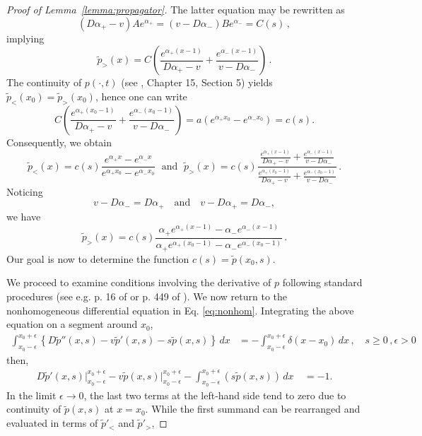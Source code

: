 \documentclass[preprint,12pt]{elsarticle}
\numberwithin{equation}{section}
\theoremstyle{plain} \newtheorem{theorem}{Theorem}[section]
\theoremstyle{plain} \newtheorem{proposition}[theorem]{Proposition}
\theoremstyle{plain} \newtheorem{lemma}[theorem]{Lemma}
\theoremstyle{plain} \newtheorem{corollary}[theorem]{Corollary}
\theoremstyle{definition} \newtheorem{definition}[theorem]{Definition}
\theoremstyle{definition} \newtheorem{notation}[theorem]{Notation}
\theoremstyle{remark} \newtheorem{remark}[theorem]{Remark}
\theoremstyle{remark} \newtheorem{remarks}[theorem]{Remarks}
\theoremstyle{remark} \newtheorem{algorithm2}[theorem]{Algorithm}
\theoremstyle{remark} \newtheorem{example}[theorem]{Example}
\begin{document}
\begin{appendices}
\begin{proof}[Proof of Lemma~\ref{lemma:propagator}]
The latter equation may be rewritten as
\begin{equation*}
	(D\alpha_+ - v)Ae^{\alpha_+} = (v - D\alpha_-)Be^{\alpha_-} = C(s)\,,
\end{equation*}
implying
\begin{equation*}
	\tilde{p}_>(x)=C\left(
	\frac{e^{\alpha_+ (x-1)}}{D\alpha_+ - v}+
	\frac{e^{\alpha_- (x-1)}}{v - D\alpha_-}
	\right)\,.
\end{equation*}
The continuity of $p(\cdot,t)$ (see \cite{karlin_taylor_1981}, Chapter 15, Section 5)
yields $\tilde{p}_<(x_0)=\tilde{p}_>(x_0)$, hence one can write
\begin{equation*}
	C\left(
	\frac{e^{\alpha_+ (x_0-1)}}{D\alpha_+ - v}+
	\frac{e^{\alpha_- (x_0-1)}}{v - D\alpha_-}
	\right)
	=
	a\left(
	e^{\alpha_+ x_0}-e^{\alpha_- x_0}
	\right)
	=c(s).
\end{equation*}
Consequently, we obtain
\begin{equation*}
	\tilde{p}_<(x)=c(s)
	\frac{e^{\alpha_+ x}-e^{\alpha_- x}}
	{e^{\alpha_+ x_0}-e^{\alpha_- x_0}}
	\; \text{ and } \;
	\tilde{p}_>(x)=c(s)
	\frac{
	\frac{e^{\alpha_+ (x-1)}}{D\alpha_+ - v}+
	\frac{e^{\alpha_- (x-1)}}{v - D\alpha_-}
	}
	{
	\frac{e^{\alpha_+ (x_0-1)}}{D\alpha_+ - v}+
	\frac{e^{\alpha_- (x_0-1)}}{v - D\alpha_-}
	}\,.
\end{equation*}
Noticing
\begin{equation*}
	v-D\alpha_-=D\alpha_+
	\quad\text{and}\quad
	v-D\alpha_+=D\alpha_-,
\end{equation*}
we have
\begin{equation*}
	\tilde{p}_>(x)=c(s)
	\frac{\alpha_+ e^{\alpha_+ (x-1)} - \alpha_- e^{\alpha_- (x-1)}}
	{\alpha_+ e^{\alpha_+ (x_0-1)} - \alpha_- e^{\alpha_- (x_0-1)}}\,.
\end{equation*}
Our goal is now to determine the function $c(s)=\tilde{p}(x_0,s)$.

We proceed to examine conditions involving the derivative of $p$ following standard procedures (see e.g. p. 16
of \cite{redner2001guide} or p. 449 of \cite{Arfken7th}). We now return to the nonhomogeneous differential equation in Eq. \eqref{eq:nonhom}. Integrating the above equation on a segment around $x_0$,
\begin{align*}
	\int_{x_0-\epsilon}^{x_0+\epsilon}\left\{ D\tilde{p}''(x,s) - v\tilde{p}'(x,s)
	-  s\tilde{p}(x,s)\right\} \, dx
	&=-\int_{x_0-\epsilon}^{x_0+\epsilon}\delta(x-x_0) \, dx \,,\quad s\geq 0\,, \epsilon>0 
 \end{align*}
 then,
 \begin{align*}
 D\tilde{p}'(x,s) \Big|_{x_0-\epsilon}^{x_0+\epsilon} - v\tilde{p}(x,s) \Big|_{x_0-\epsilon}^{x_0+\epsilon} - \int_{x_0-\epsilon}^{x_0+\epsilon}\left(s\tilde{p}(x,s)\right) \, dx \
	&=-1.
\end{align*}
In the limit $\epsilon \rightarrow 0$, the last two terms at the left-hand side tend to zero due to continuity of $\tilde{p}(x,s)$ at $x = x_0$. While the first summand can be rearranged and evaluated in terms of $\tilde{p}'_<$ and $\tilde{p}'_>$,


\end{proof}
\end{appendices}
\end{document}
